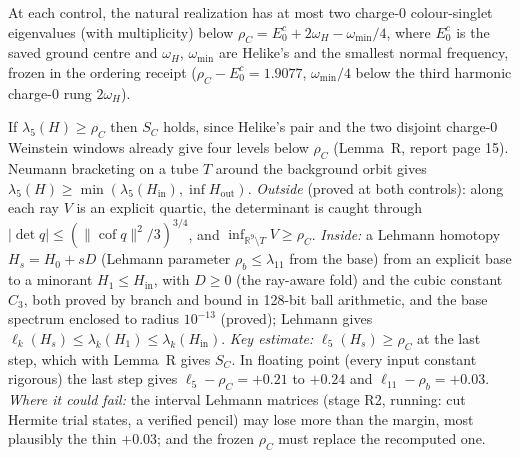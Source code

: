 \begin{conjecture}[$S_C$]\label{p3conj:sc}
 At each control, the natural realization has at most two charge-$0$ colour-singlet eigenvalues (with
multiplicity) below $\rho_C=E_0^c+2\omega_H-\omega_{\min}/4$, where $E_0^c$ is the saved ground centre and $\omega_H$,
$\omega_{\min}$ are Helike's and the smallest normal frequency, frozen in the ordering receipt ($\rho_C-E_0^c=1.9077$,
$\omega_{\min}/4$ below the third harmonic charge-$0$ rung $2\omega_H$).
\end{conjecture}
\begin{sketch}
If $\lambda_5(H)\geq\rho_C$ then $S_C$ holds, since Helike's pair and the two disjoint charge-$0$ Weinstein windows already
give four levels below $\rho_C$ (Lemma~R, report page 15). Neumann bracketing on a tube $T$ around the background orbit
gives $\lambda_5(H)\geq\min(\lambda_5(H_{\mathrm{in}}),\inf H_{\mathrm{out}})$. \emph{Outside} (proved at both controls):
along each ray $V$ is an explicit quartic, the determinant is caught through $|\det q|\leq(\|\operatorname{cof}q\|^2/3)^{3/4}$,
and $\inf_{\mathbb R^9\setminus T}V\geq\rho_C$. \emph{Inside:} a Lehmann homotopy $H_s=H_0+sD$ (Lehmann parameter $\rho_b\leq\lambda_{11}$ from the base) from an explicit base to a
minorant $H_1\leq H_{\mathrm{in}}$, with $D\geq0$ (the ray-aware fold) and the cubic constant $C_3$, both proved by branch
and bound in 128-bit ball arithmetic, and the base spectrum enclosed to radius $10^{-13}$ (proved); Lehmann gives
$\ell_k(H_s)\leq\lambda_k(H_1)\leq\lambda_k(H_{\mathrm{in}})$. \emph{Key estimate:} $\ell_5(H_s)\geq\rho_C$ at the last step, which with Lemma~R gives $S_C$. In floating point
(every input constant rigorous) the last step gives $\ell_5-\rho_C=+0.21$ to $+0.24$ and $\ell_{11}-\rho_b=+0.03$.
\emph{Where it could fail:} the interval Lehmann matrices (stage R2, running: cut Hermite trial states, a verified pencil) may
lose more than the margin, most plausibly the thin $+0.03$; and the frozen $\rho_C$ must replace the recomputed one.
\end{sketch}

